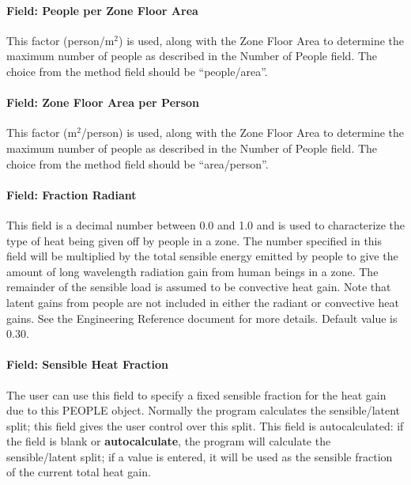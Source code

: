 \paragraph{Field: People per Zone Floor Area}\label{field-people-per-zone-floor-area}

This factor (person/m\(^{2}\)) is used, along with the Zone Floor Area to determine the maximum number of people as described in the Number of People field. The choice from the method field should be ``people/area''.

\paragraph{Field: Zone Floor Area per Person}\label{field-zone-floor-area-per-person}

This factor (m\(^{2}\)/person) is used, along with the Zone Floor Area to determine the maximum number of people as described in the Number of People field. The choice from the method field should be ``area/person''.

\paragraph{Field: Fraction Radiant}\label{field-fraction-radiant}

This field is a decimal number between 0.0 and 1.0 and is used to characterize the type of heat being given off by people in a zone. The number specified in this field will be multiplied by the total sensible energy emitted by people to give the amount of long wavelength radiation gain from human beings in a zone. The remainder of the sensible load is assumed to be convective heat gain. Note that latent gains from people are not included in either the radiant or convective heat gains. See the Engineering Reference document for more details. Default value is 0.30.

\paragraph{Field: Sensible Heat Fraction}\label{field-sensible-heat-fraction}

The user can use this field to specify a fixed sensible fraction for the heat gain due to this PEOPLE object. Normally the program calculates the sensible/latent split; this field gives the user control over this split. This field is autocalculated: if the field is blank or \textbf{autocalculate}, the program will calculate the sensible/latent split; if a value is entered, it will be used as the sensible fraction of the current total heat gain.

